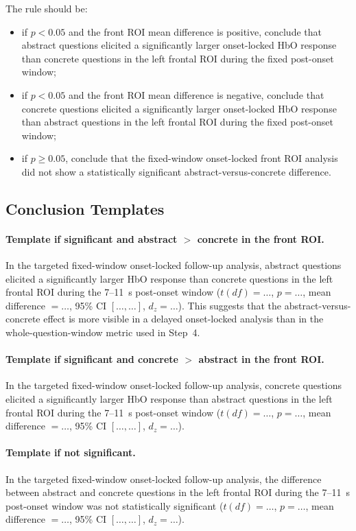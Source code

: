 \documentclass[11pt]{article}
\begin{document}
The rule should be:
\begin{itemize}
    \item if \(p < 0.05\) and the front ROI mean difference is positive, conclude that abstract
    questions elicited a significantly larger onset-locked HbO response than concrete questions
    in the left frontal ROI during the fixed post-onset window;
    \item if \(p < 0.05\) and the front ROI mean difference is negative, conclude that concrete
    questions elicited a significantly larger onset-locked HbO response than abstract questions
    in the left frontal ROI during the fixed post-onset window;
    \item if \(p \geq 0.05\), conclude that the fixed-window onset-locked front ROI analysis
    did not show a statistically significant abstract-versus-concrete difference.
\end{itemize}

\subsection{Conclusion Templates}

\paragraph{Template if significant and abstract \(>\) concrete in the front ROI.}
In the targeted fixed-window onset-locked follow-up analysis, abstract questions elicited a
significantly larger HbO response than concrete questions in the left frontal ROI during the
7--11~s post-onset window
(\(t(df)=\ldots\), \(p=\ldots\), mean difference \(=\ldots\), 95\% CI \([\ldots,\ldots]\), \(d_z=\ldots\)).
This suggests that the abstract-versus-concrete effect is more visible in a delayed onset-locked
analysis than in the whole-question-window metric used in Step~4.

\paragraph{Template if significant and concrete \(>\) abstract in the front ROI.}
In the targeted fixed-window onset-locked follow-up analysis, concrete questions elicited a
significantly larger HbO response than abstract questions in the left frontal ROI during the
7--11~s post-onset window
(\(t(df)=\ldots\), \(p=\ldots\), mean difference \(=\ldots\), 95\% CI \([\ldots,\ldots]\), \(d_z=\ldots\)).

\paragraph{Template if not significant.}
In the targeted fixed-window onset-locked follow-up analysis, the difference between abstract and
concrete questions in the left frontal ROI during the 7--11~s post-onset window was not
statistically significant
(\(t(df)=\ldots\), \(p=\ldots\), mean difference \(=\ldots\), 95\% CI \([\ldots,\ldots]\), \(d_z=\ldots\)).
\end{document}
